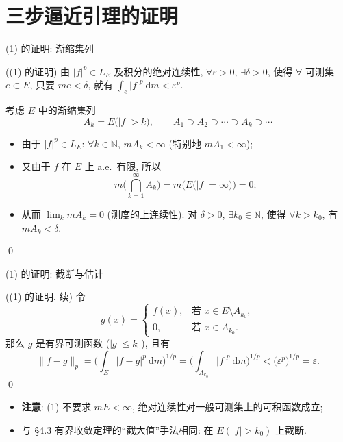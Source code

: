 
\section[三步逼近]{三步逼近引理的证明}


\begin{frame}{(1) 的证明: 渐缩集列}

\startproof[bg=yellow, fg=red]((1) 的证明)
由 $|f|^p \in L_E$ 及积分的\alert{绝对连续性}, $\forall \varepsilon > 0$,
$\exists \delta > 0$, 使得 $\forall$ 可测集 $e \subset E$, 只要 $me < \delta$,
就有 $\int_e |f|^p ~ \mathrm{d} m < \varepsilon^p$.

\pause
考虑 $E$ 中的渐缩集列
\[
A_k = E\big( |f| > k \big),
\qquad
A_1 \supset A_2 \supset \cdots \supset A_k \supset \cdots
\]
\begin{itemize}
\item 由于 $|f|^p \in L_E$: $\forall k \in \mathbb{N}$, $mA_k < \infty$
  (特别地 $mA_1 < \infty$);
\item 又由于 $f$ 在 $E$ 上 a.e.\ 有限, 所以
\[
m \Big( \bigcap_{k=1}^{\infty} A_k \Big)
= m \big( E\big( |f| = \infty \big) \big) = 0 ;
\]
\item 从而 $\lim_k mA_k = 0$ (测度的上连续性): 对 $\delta > 0$,
  $\exists k_0 \in \mathbb{N}$, 使得 $\forall k > k_0$, 有 $mA_k < \delta$.
\end{itemize}
\qed

\end{frame}


\begin{frame}{(1) 的证明: 截断与估计}

\startproof[bg=yellow, fg=red]((1) 的证明, 续)
令
\[
g(x) =
\begin{cases}
f(x), & \text{若 } x \in E \setminus A_{k_0}, \\
0, & \text{若 } x \in A_{k_0}.
\end{cases}
\]
\pause
那么 $g$ 是有界可测函数 ($|g| \leqslant k_0$), 且有
\[
\lVert f - g \rVert_p
= \Big( \int_E |f - g|^p ~ \mathrm{d} m \Big)^{\!1/p}
= \Big( \int_{A_{k_0}} |f|^p ~ \mathrm{d} m \Big)^{\!1/p}
< \big( \varepsilon^p \big)^{1/p}
= \varepsilon .
\]
\qed

\pause

\begin{itemize}
\item \textbf{注意}: (1) 不要求 $mE < \infty$, 绝对连续性对一般可测集上的可积函数成立;
\item 与 \S 4.3 有界收敛定理的``截大值''手法相同: 在 $E(|f| > k_0)$ 上截断.
\end{itemize}

\end{frame}

